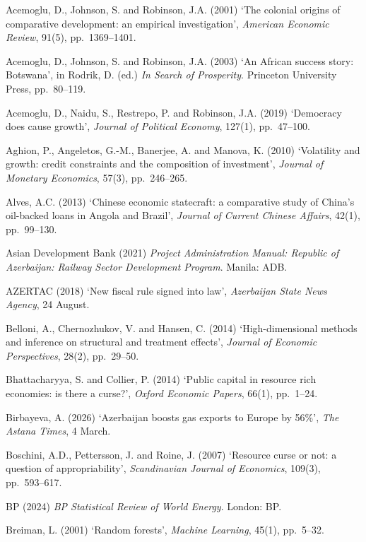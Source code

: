 \documentclass[12pt,a4paper]{report}
\begin{document}
\begin{flushleft}
\setlength{\parskip}{4pt}

Acemoglu, D., Johnson, S. and Robinson, J.A. (2001) `The colonial origins of comparative development: an empirical investigation', \textit{American Economic Review}, 91(5), pp.~1369--1401.

Acemoglu, D., Johnson, S. and Robinson, J.A. (2003) `An African success story: Botswana', in Rodrik, D. (ed.) \textit{In Search of Prosperity}. Princeton University Press, pp.~80--119.

Acemoglu, D., Naidu, S., Restrepo, P. and Robinson, J.A. (2019) `Democracy does cause growth', \textit{Journal of Political Economy}, 127(1), pp.~47--100.

Aghion, P., Angeletos, G.-M., Banerjee, A. and Manova, K. (2010) `Volatility and growth: credit constraints and the composition of investment', \textit{Journal of Monetary Economics}, 57(3), pp.~246--265.

Alves, A.C. (2013) `Chinese economic statecraft: a comparative study of China's oil-backed loans in Angola and Brazil', \textit{Journal of Current Chinese Affairs}, 42(1), pp.~99--130.

Asian Development Bank (2021) \textit{Project Administration Manual: Republic of Azerbaijan: Railway Sector Development Program}. Manila: ADB.

AZERTAC (2018) `New fiscal rule signed into law', \textit{Azerbaijan State News Agency}, 24 August.

Belloni, A., Chernozhukov, V. and Hansen, C. (2014) `High-dimensional methods and inference on structural and treatment effects', \textit{Journal of Economic Perspectives}, 28(2), pp.~29--50.

Bhattacharyya, S. and Collier, P. (2014) `Public capital in resource rich economies: is there a curse?', \textit{Oxford Economic Papers}, 66(1), pp.~1--24.

Birbayeva, A. (2026) `Azerbaijan boosts gas exports to Europe by 56\%', \textit{The Astana Times}, 4 March.

Boschini, A.D., Pettersson, J. and Roine, J. (2007) `Resource curse or not: a question of appropriability', \textit{Scandinavian Journal of Economics}, 109(3), pp.~593--617.

BP (2024) \textit{BP Statistical Review of World Energy}. London: BP.

Breiman, L. (2001) `Random forests', \textit{Machine Learning}, 45(1), pp.~5--32.


\end{flushleft}
\end{document}
